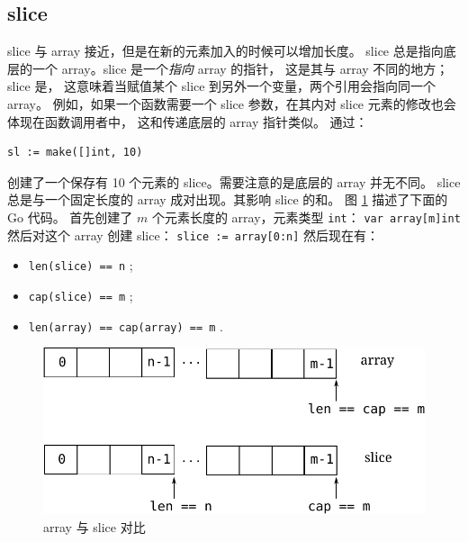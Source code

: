 \subsection{slice}
\label{sec:slices}
slice 与 array 接近，但是在新的元素加入的时候可以增加长度。
slice 总是指向底层的一个 array。slice 是一个\emph{指向} array 的指针，
这是其与 array 不同的地方；
slice 是，
这意味着当赋值某个 slice 到另外一个变量，两个引用会指向同一个 array。
例如，如果一个函数需要一个 slice 参数，在其内对 slice 元素的修改也会体现在函数调用者中，
这和传递底层的 array 指针类似。
通过：
\begin{lstlisting}
sl := make([]int, 10)
\end{lstlisting}
创建了一个保存有 10 个元素的 slice。需要注意的是底层的 array 并无不同。
slice 总是与一个固定长度的 array 成对出现。其影响 slice 
的和。
图 \ref{fig:array-vs-slice} 描述了下面的 Go 代码。
首先创建了 $m$ 个元素长度的 array，元素类型 \lstinline{int}：
\lstinline{var array[m]int}\newline
然后对这个 array 创建 slice：
\lstinline{slice := array[0:n]}\newline
然后现在有：
\begin{itemize}
\item{\lstinline{len(slice) == n}{} ;}
\item{\lstinline{cap(slice) == m}{} ;}
\item{\lstinline{len(array) == cap(array) == m}{} .}
\end{itemize}
\begin{figure}[H]
\caption{array 与 slice 对比}
\label{fig:array-vs-slice}
\begin{center}
\includegraphics[scale=0.65]{fig/array-vs-slice.pdf}
\end{center}
\end{figure}

